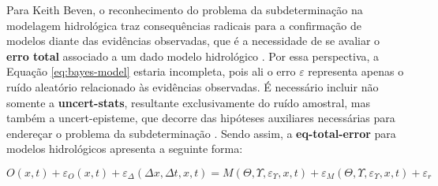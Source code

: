 \documentclass[./main.tex]{subfiles}
\begin{document}
\par Para Keith Beven, o reconhecimento do problema da subdeterminação na modelagem hidrológica traz consequências radicais para a confirmação de modelos diante das evidências observadas, que é a necessidade de se avaliar o \textbf{erro total} associado a um dado modelo hidrológico \cite{Beven2005}. Por essa perspectiva, a Equação \eqref{eq:bayes-model} estaria incompleta, pois ali o erro $\varepsilon$ representa apenas o ruído aleatório relacionado às evidências observadas. É necessário incluir não somente a \textbf{\gls{uncert-stats}}, resultante exclusivamente do ruído amostral, mas também a \gls{uncert-episteme}, que decorre das hipóteses auxiliares necessárias para endereçar o problema da subdeterminação \cite{Beven2016}. Sendo assim, a \textbf{\gls{eq-total-error}} para modelos hidrológicos apresenta a seguinte forma:
\begin{linenomath*}
\begin{equation}
\label{eq:total-error}
    O(x, t) + \varepsilon_{O}(x, t) + \varepsilon_{\Delta}(\Delta x,\Delta t, x, t) = M(\Theta, \Upsilon, \varepsilon_{\Upsilon}, x, t) + \varepsilon_{M}(\Theta, \Upsilon, \varepsilon_{\Upsilon}, x, t) + \varepsilon_r
\end{equation}
\end{linenomath*}
\end{document}
